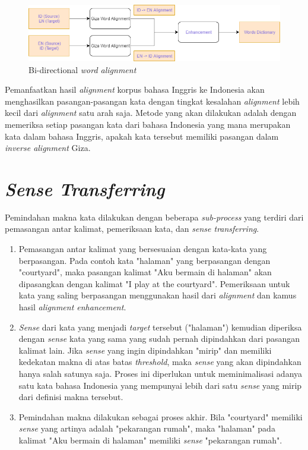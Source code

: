 \begin{figure}
	\centering
	\includegraphics[width=1\linewidth]{adit_pics/bidirectional-enhancement.png}
	\caption{Bi-directional \textit{word alignment}}
	\label{fig:Bidirectional-Enhancement}
\end{figure}


Pemanfaatkan hasil \textit{alignment} korpus bahasa Inggris ke Indonesia akan menghasilkan pasangan-pasangan kata dengan tingkat kesalahan \textit{alignment} lebih kecil dari \textit{alignment} satu arah saja. Metode yang akan dilakukan adalah dengan memeriksa setiap pasangan kata dari bahasa Indonesia yang mana merupakan kata dalam bahasa Inggris, apakah kata tersebut memiliki pasangan dalam \textit{inverse alignment} Giza.




\section{\textit{Sense Transferring}} \label{sec:Sense Transferring}
Pemindahan makna kata dilakukan dengan beberapa \textit{sub-process} yang terdiri dari pemasangan antar kalimat, pemeriksaan kata, dan \textit{sense transferring}.
\begin{enumerate}
	\item Pemasangan antar kalimat yang bersesuaian dengan kata-kata yang berpasangan. Pada contoh kata "halaman" yang berpasangan dengan "courtyard", maka pasangan kalimat "Aku bermain di halaman" akan dipasangkan dengan kalimat "I play at the courtyard". Pemeriksaan untuk kata yang saling berpasangan menggunakan hasil dari \textit{alignment} dan kamus hasil \textit{alignment enhancement}.
	\item \textit{Sense} dari kata yang menjadi \textit{target} tersebut ("halaman") kemudian diperiksa dengan \textit{sense} kata yang sama yang sudah pernah dipindahkan dari pasangan kalimat lain. Jika \textit{sense} yang ingin dipindahkan "mirip" dan memiliki kedekatan makna di atas batas \textit{threshold}, maka \textit{sense} yang akan dipindahkan hanya salah satunya saja. Proses ini diperlukan untuk meminimalisasi adanya satu kata bahasa Indonesia yang mempunyai lebih dari satu \textit{sense} yang mirip dari definisi makna tersebut.
	\item Pemindahan makna dilakukan sebagai proses akhir. Bila "courtyard" memiliki \textit{sense} yang artinya adalah "pekarangan rumah", maka "halaman" pada kalimat "Aku bermain di halaman" memiliki \textit{sense} "pekarangan rumah".
\end{enumerate}

